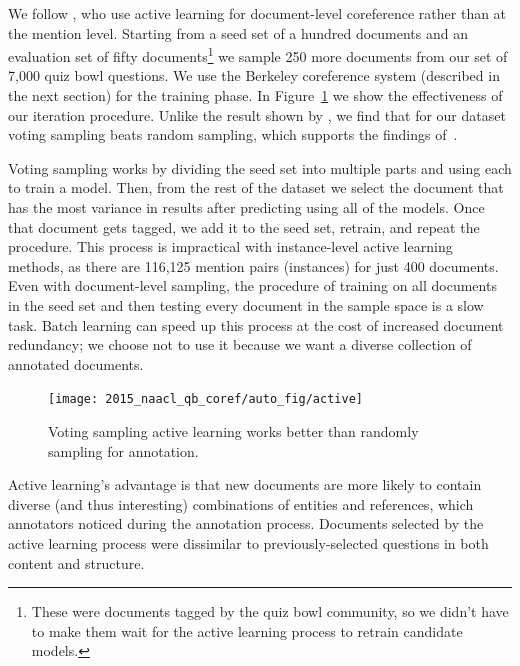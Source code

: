 We follow , who use active learning for document-level
coreference rather than at the mention level. Starting from a seed set of a
hundred documents and an evaluation set of fifty documents\footnote{These were
  documents tagged by the quiz bowl community, so we didn't have to make them
  wait for the active learning process to retrain candidate models.} we sample
250 more documents from our set of 7,000 quiz bowl questions. We use the
Berkeley coreference system (described in the next section) for the training
phase. In Figure~\ref{fig:al} we show the effectiveness of our iteration
procedure. Unlike the result shown by , we find that
for our dataset voting sampling beats random sampling, which supports the
findings of~.

Voting sampling works by dividing the seed set into multiple parts and using each
to train a model. Then, from the rest of the dataset we select the document that has the most
variance in results after predicting using all of the models. Once that document gets tagged, we add it to the seed set, retrain, and repeat the procedure. This process is
impractical with instance-level active learning methods, as there are 116,125 mention pairs (instances) for just 400 documents. Even with document-level sampling, the procedure of training on all
documents in the seed set and then testing every document in the sample space is
a slow task. Batch learning can speed up this process at the cost of increased document redundancy; we choose not to use it because we want a diverse collection of annotated documents.
\begin{figure}[t!]
  \centering
  \texttt{[image: 2015\_naacl\_qb\_coref/auto\_fig/active]}
  \caption{Voting sampling active learning works better than randomly sampling for annotation.}
  \label{fig:al}
\end{figure}
Active learning's advantage is that new documents are more likely to contain diverse (and thus interesting) combinations of entities and references, which annotators noticed during the annotation process. Documents selected by the active learning process were dissimilar to previously-selected questions in both content and structure.